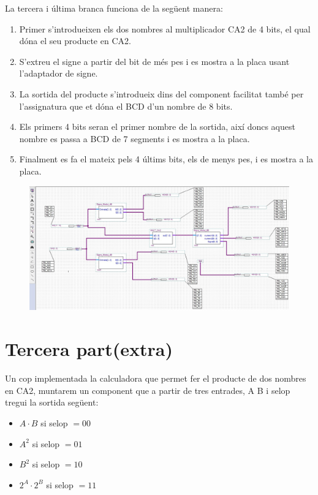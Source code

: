\documentclass[12pt, a4papre]{article}
\begin{document}
	La tercera i última branca funciona de la següent manera:
	\begin{enumerate}
	\item Primer s'introdueixen els dos nombres al multiplicador CA2 de 4 bits, el qual dóna el seu producte en CA2.
	\item	S'extreu el signe a partir del bit de més pes i es mostra a la placa usant l'adaptador de signe.
	\item La sortida del producte s'introdueix dins del component facilitat també per l'assignatura que et dóna el BCD d'un nombre de 8 bits.
	\item Els primers 4 bits seran el primer nombre de la sortida, així doncs aquest nombre es passa a BCD de 7 segments i es mostra a la placa.
	\item Finalment es fa el mateix pels 4 últims bits, els de menys pes, i es mostra a la placa.
	\end{enumerate}
	
	\begin{center}
	\begin{figure}[H]
		\begin{center}
		\includegraphics[width=150mm]{multFinal.jpeg}
		\end{center}
	\end{figure}
	
	\end{center}
	
	\newpage
	\section{Tercera part(extra)}
	
	Un cop implementada la calculadora que permet fer el producte de dos nombres en CA2, muntarem un component que a partir de tres entrades, A B i selop tregui la sortida següent:
	
	\begin{itemize}
	\item $A\cdot B$ si selop $=00$
	\item $A^2$ si selop $=01$
	\item $B^2$ si selop $=10$
	\item$2^A\cdot2^B$ si selop $=11$
	\end{itemize}
	
\end{document}
